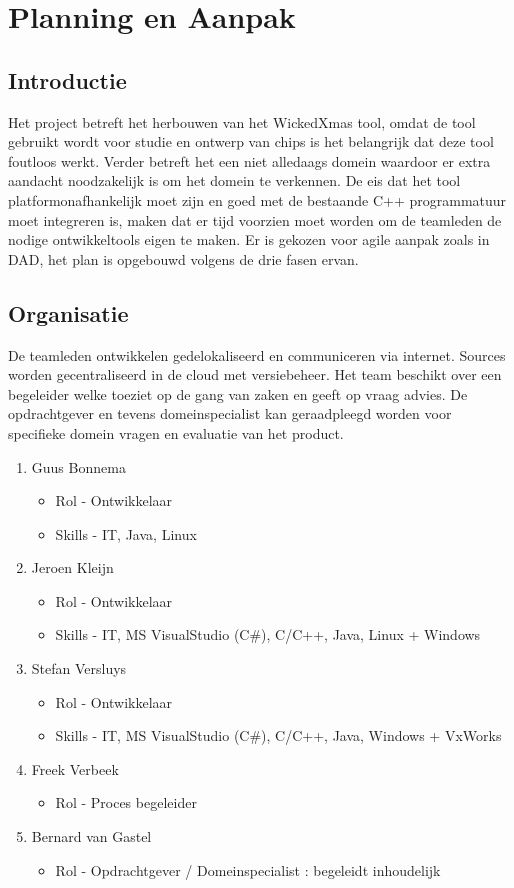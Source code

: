 
\section{Planning en Aanpak}
\subsection{Introductie}
Het project betreft het herbouwen van het WickedXmas tool, omdat de tool gebruikt wordt voor studie
en ontwerp van chips is het belangrijk dat deze tool foutloos werkt. Verder betreft het een niet
alledaags domein waardoor er extra aandacht noodzakelijk is om het domein te verkennen. De eis dat
het tool platformonafhankelijk moet zijn en goed met de bestaande C++ programmatuur moet integreren is,
maken dat er tijd voorzien moet worden om de teamleden de nodige ontwikkeltools eigen te maken.
Er is gekozen voor agile aanpak zoals in DAD, het plan is opgebouwd volgens de drie fasen ervan.

\subsection{Organisatie}
 De teamleden ontwikkelen gedelokaliseerd en communiceren via internet. Sources worden gecentraliseerd
 in de cloud met versiebeheer. Het team beschikt over een begeleider welke toeziet op de gang van zaken
 en geeft op vraag advies. De opdrachtgever en tevens domeinspecialist kan geraadpleegd worden voor
 specifieke domein vragen en evaluatie van het product.
 \begin{enumerate}
 	\item Guus Bonnema
 	\begin{itemize}
		\item Rol - Ontwikkelaar
		\item Skills - IT, Java, Linux
	\end{itemize}
 	\item Jeroen Kleijn
 	\begin{itemize}
		\item Rol - Ontwikkelaar
		\item Skills - IT,  MS VisualStudio (C\#), C/C++, Java, Linux + Windows
	\end{itemize}
 	\item Stefan Versluys
 	\begin{itemize}
		\item Rol - Ontwikkelaar
		\item Skills - IT,  MS VisualStudio (C\#), C/C++, Java, Windows + VxWorks
	\end{itemize}
	\item Freek Verbeek
	\begin{itemize}
		\item Rol - Proces begeleider
	\end{itemize}
	\item Bernard van Gastel
	\begin{itemize}
		\item Rol - Opdrachtgever / Domeinspecialist : begeleidt inhoudelijk
	\end{itemize}
 \end{enumerate}

